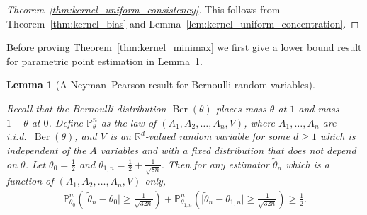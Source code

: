 \documentclass[11pt,lof]{puthesis}
\renewcommand{\P}{\ensuremath{\mathbb{P}}}
\newcommand{\R}{\ensuremath{\mathbb{R}}}
\DeclareMathOperator{\Ber}{Ber}
\theoremstyle{break}
\newtheorem{lemma}{Lemma}[section]
\theoremstyle{proof}
\newtheorem{proof}{Proof}
\begin{document}
\begin{proof}[Theorem~\ref{thm:kernel_uniform_consistency}]
This follows from Theorem~\ref{thm:kernel_bias}
and Lemma~\ref{lem:kernel_uniform_concentration}.
\end{proof}

Before proving Theorem~\ref{thm:kernel_minimax}
we first give a lower bound result
for parametric point estimation in
Lemma~\ref{lem:kernel_app_neyman_pearson_bernoulli}.

\begin{lemma}[A Neyman--Pearson result for Bernoulli random variables]
\label{lem:kernel_app_neyman_pearson_bernoulli}

Recall that the Bernoulli distribution
$\Ber(\theta)$
places mass $\theta$ at $1$ and mass
$1-\theta$ at $0$.
Define $\P_\theta^n$ as the law of
$(A_1, A_2, \ldots, A_n, V)$,
where $A_1, \ldots, A_n$
are i.i.d.\ $\Ber(\theta)$,
and $V$ is an $\R^d$-valued random variable
for some $d \geq 1$
which is independent of the $A$ variables
and with a fixed distribution that does not depend on $\theta$.
Let $\theta_0 = \frac{1}{2}$
and $\theta_{1,n} = \frac{1}{2} + \frac{1}{\sqrt{8n}}$.
Then for any estimator $\tilde \theta_n$
which is a function of
$(A_1, A_2, \ldots, A_n, V)$ only,
%
\begin{align*}
\P_{\theta_0}^n \left(
\big| \tilde \theta_n - \theta_0 \big|
\geq \frac{1}{\sqrt{32n}}
\right)
+ \P_{\theta_{1,n}}^n \left(
\big| \tilde \theta_n - \theta_{1,n} \big|
\geq \frac{1}{\sqrt{32n}}
\right)
\geq \frac{1}{2}.
\end{align*}

\end{lemma}
\end{document}
